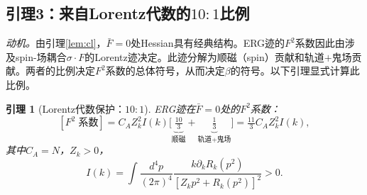 \documentclass[12pt,a4paper]{article}
\theoremstyle{plain}
\newtheorem{lemma}[theorem]{引理}
\theoremstyle{definition}
\theoremstyle{remark}
\begin{document}
\subsection{引理3：来自Lorentz代数的$10{:}1$比例}\label{sec:lemma3}

\textit{动机。}由引理\ref{lem:cl}，$\bar{F}=0$处Hessian具有经典结构。ERG迹的$F^2$系数因此由涉及spin-场耦合$\sigma\cdot F$的Lorentz迹决定。此迹分解为顺磁（spin）贡献和轨道$+$鬼场贡献。两者的比例决定$F^2$系数的总体符号，从而决定$\beta$的符号。以下引理显式计算此比例。

\begin{lemma}[Lorentz代数保护：$10{:}1$]\label{lem:101}
ERG迹在$\bar{F}=0$处的$F^2$系数：
\begin{equation}\label{eq:F2decomp}
[F^2\;\text{系数}] = C_AZ_k^2I(k)\Big[\underbrace{\tfrac{10}{3}}_{\text{顺磁}}+\underbrace{\tfrac{1}{3}}_{\text{轨道+鬼场}}\Big] = \tfrac{11}{3}C_AZ_k^2I(k),
\end{equation}
其中$C_A=N$，$Z_k>0$，
\begin{equation}\label{eq:Ik}
I(k) = \int\frac{d^4p}{(2\pi)^4}\frac{k\partial_kR_k(p^2)}{[Z_kp^2+R_k(p^2)]^2} > 0.
\end{equation}
\end{lemma}
\end{document}
